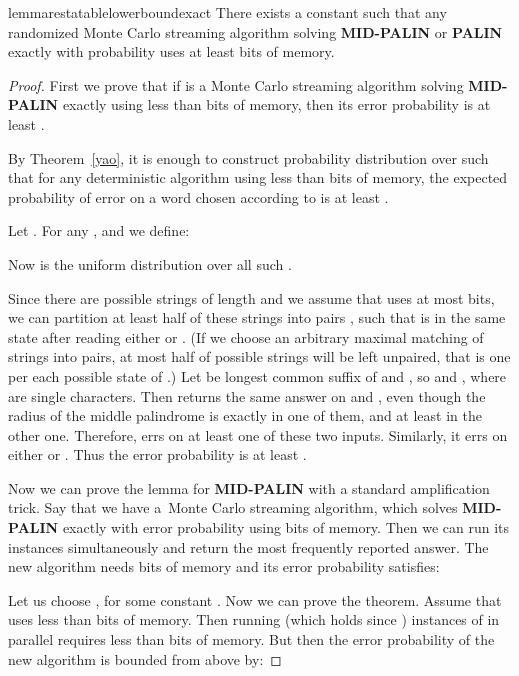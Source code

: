 \documentclass{article}[11pt,letter]
\newcommand{\midpalin}[1][n]{{\bf MID-PALIN}\xspace}
\newcommand{\palin}[1][n]{{\bf PALIN}\xspace}
\begin{document}
\begin{restatable}{lemma}{restatablelowerboundexact}
\label{lowerbound:exact}
There exists a constant   such that any randomized Monte Carlo streaming algorithm
 solving \midpalin or \palin exactly with probability 
uses at least  bits of memory.
\end{restatable}


\begin{proof}
First we prove that if  is a Monte Carlo streaming algorithm solving \midpalin exactly using less than  bits
of memory, then its error probability is at least .

By Theorem~\ref{yao}, it is enough to construct probability distribution  over  such that for any deterministic
algorithm  using less than  bits of memory, the expected probability of error on a word chosen
according to  is at least .

Let . For any ,  and  we define:

Now  is the uniform distribution over all such .

Since there are  possible strings of length  and we assume that
 uses at most  bits,
we can 
partition at least half of these strings into pairs , such that  is in the same state after reading either  or . (If we choose an arbitrary maximal
matching of strings into pairs, at most half of possible strings will be left unpaired, that is one per each possible state of .)
Let  be longest common suffix of  and , so  and , where  are single characters.  Then
 returns the same answer on  and , even though the radius of the middle palindrome is exactly  in one of
them, and at least  in the other one. Therefore,  errs on at least one of these two inputs. Similarly, it errs on either
 or . Thus the error probability is at least . 

Now we can prove the lemma for \midpalin with a standard amplification trick.
Say that we have a~Monte Carlo streaming algorithm, which solves \midpalin exactly
with error probability  using  bits of memory. Then we can run its  instances simultaneously and return
the most frequently reported answer. The new algorithm needs  bits of memory and its error probability  satisfies:


Let us choose , for some constant .
Now we can prove the theorem. Assume that  uses less than  bits of memory. Then running  (which holds since )
instances of  in parallel requires less than  bits of memory. But then 
the error probability of the new algorithm is bounded from above by:


\end{proof}
\end{document}
